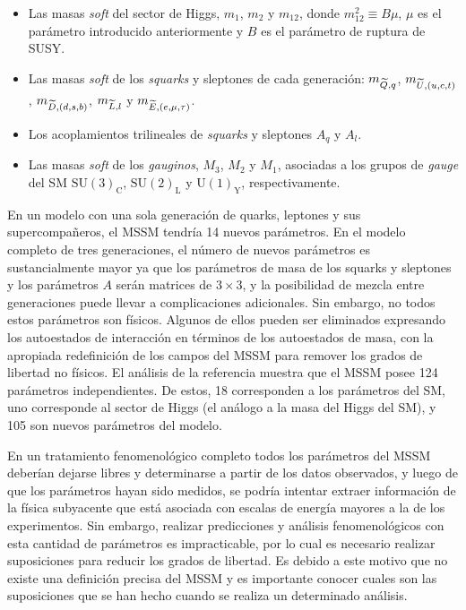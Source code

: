 \begin{itemize}\itemsep0.2cm\parskip0.2cm
\item Las masas \emph{soft} del sector de Higgs, $m_1$, $m_2$ y $m_{12}$, donde $m_{12}^2 \equiv B\mu$,
  $\mu$ es el parámetro introducido anteriormente y $B$ es el parámetro de ruptura
  de SUSY.

\item Las masas \emph{soft} de los \emph{squarks} y sleptones de cada generación:
  $m_{\widetilde{Q},q}$, $m_{\widetilde{U},(u,c,t)}$, $m_{\widetilde{D},(d,s,b)}$, $m_{\widetilde{L},l}$ y
  $m_{\widetilde{E},(e,\mu,\tau)}$.

\item Los acoplamientos trilineales de \emph{squarks} y sleptones $A_q$ y $A_l$.

\item Las masas \emph{soft} de los \emph{gauginos}, $M_3$, $M_2$ y $M_1$, asociadas a los
  grupos de \emph{gauge} del SM $\text{SU}(3)_\text{C}$, $\text{SU}(2)_\text{L}$ y $\text{U}(1)_\text{Y}$, respectivamente.

\end{itemize}


En un modelo con una sola generación de quarks, leptones y sus
supercompa\~neros, el MSSM tendría 14 nuevos parámetros. En el modelo
completo de tres generaciones, el número de nuevos parámetros es sustancialmente
mayor ya que los parámetros de masa de los squarks y sleptones y los parámetros
$A$ serán matrices de $3 \times 3$, y la posibilidad de mezcla entre
generaciones puede llevar a complicaciones adicionales. Sin embargo, no todos
estos parámetros son físicos. Algunos de ellos pueden ser eliminados
expresando los autoestados de interacción en términos de los autoestados de
masa, con la apropiada redefinición de los campos del MSSM para remover los
grados de libertad no físicos. El análisis de la referencia
\cite{Dimopoulos:1995ju} muestra que el MSSM posee 124 parámetros
independientes. De estos, 18 corresponden a los parámetros del SM, uno
corresponde al sector de Higgs (el análogo a la masa del Higgs del SM), y 105
son nuevos parámetros del modelo.

En un tratamiento fenomenológico completo todos los parámetros del MSSM deberían
dejarse libres y determinarse a partir de los datos observados, y luego de que
los parámetros hayan sido medidos, se podría intentar extraer información de la
física subyacente que está asociada con escalas de energía mayores a la de los
experimentos. Sin embargo, realizar predicciones y análisis fenomenológicos con esta
cantidad de parámetros es impracticable, por lo cual es necesario realizar
suposiciones para reducir los grados de libertad. Es debido a este motivo que no
existe una definición precisa del MSSM y es importante conocer cuales son las
suposiciones que se han hecho cuando se realiza un determinado análisis.


